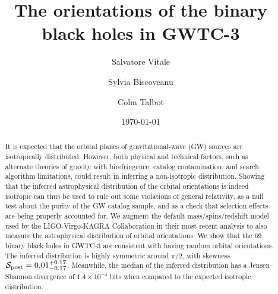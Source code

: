 \documentclass[floats,floatfix,showpacs,amssymb,prl,twocolumn,superscriptaddress,nofootinbib]{revtex4-2}
\newcommand{\catalog}{GWTC-3\xspace}
\begin{document}
\title{The orientations of the binary black holes in \catalog}
\author{Salvatore Vitale}
\author{Sylvia Biscoveanu}
\author{Colm Talbot}
\date{\today}

\begin{abstract}
It is expected that the orbital planes of gravitational-wave (GW) sources are isotropically distributed. However, both physical and technical factors, such as alternate theories of gravity with birefringence, catalog contamination, and search algorithm limitations, could result in inferring a non-isotropic distribution.
Showing that the inferred astrophysical distribution of the orbital orientations is indeed isotropic can thus be used to rule out some violations of general relativity, as a null test about the purity of the GW catalog sample, and as a check that selection effects are being properly accounted for. We augment the default mass/spins/redshift model used by the LIGO-Virgo-KAGRA Collaboration in their most recent analysis to also measure the astrophysical distribution of orbital orientations. We show that the 69 binary black holes in \catalog are consistent with having random orbital orientations. The inferred distribution is highly symmetric around $\pi/2$, with skewness $\mathcal{S}_{\rm{post}}=0.01^{+0.17}_{-0.17}$.  Meanwhile, the median of the inferred distribution has a Jensen–Shannon divergence of $1.4\times 10^{-4}$ bits when compared to the expected isotropic distribution. 
\end{abstract}
\end{document}
